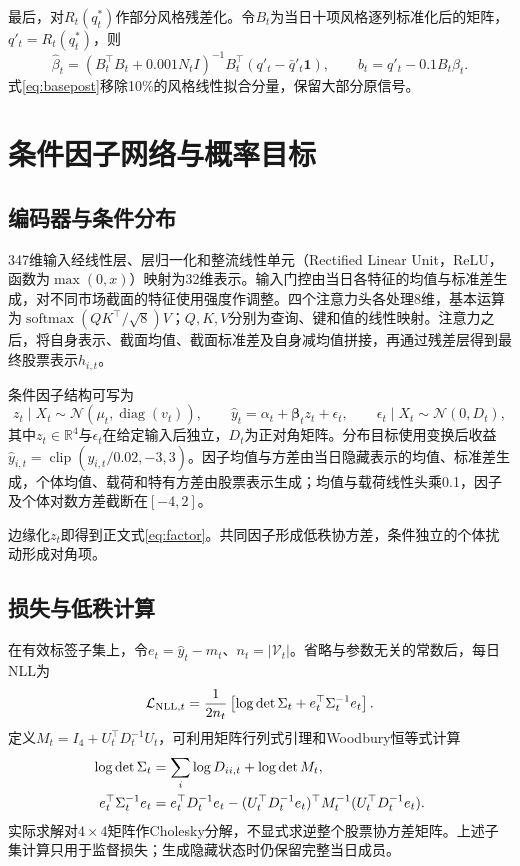 \documentclass[UTF8,11pt,a4paper,fontset=fandol]{ctexart}
\newcommand{\R}{\mathbb{R}}
\newcommand{\Beta}{\bm{\beta}}
\newcommand{\diag}{\operatorname{diag}}
\newcommand{\clip}{\operatorname{clip}}
\begin{document}
最后，对$R_t(q^*_t)$作部分风格残差化。令$B_t$为当日十项风格逐列标准化后的矩阵，$q'_t=R_t(q^*_t)$，则
\begin{equation}
 \hat\beta_t=(B_t^\top B_t+0.001N_t I)^{-1}B_t^\top(q'_t-\bar q'_t\bm 1),\qquad
 b_t=q'_t-0.1B_t\hat\beta_t.
 \label{eq:basepost}
\end{equation}
式\eqref{eq:basepost}移除10\%的风格线性拟合分量，保留大部分原信号。

\section{条件因子网络与概率目标}\label{app:factor}
\subsection{编码器与条件分布}
347维输入经线性层、层归一化和整流线性单元（Rectified Linear Unit，ReLU，函数为$\max(0,x)$）映射为32维表示。输入门控由当日各特征的均值与标准差生成，对不同市场截面的特征使用强度作调整。四个注意力头各处理8维，基本运算为$\operatorname{softmax}(QK^\top/\sqrt{8})V$；$Q,K,V$分别为查询、键和值的线性映射。注意力之后，将自身表示、截面均值、截面标准差及自身减均值拼接，再通过残差层得到最终股票表示$h_{i,t}$。

条件因子结构可写为
\begin{equation}
 z_t\mid X_t\sim\mathcal N(\mu_t,\diag(v_t)),\qquad
 \hat y_t=\alpha_t+\Beta_tz_t+\epsilon_t,\qquad
 \epsilon_t\mid X_t\sim\mathcal N(0,D_t),
 \label{eq:generative}
\end{equation}
其中$z_t\in\R^4$与$\epsilon_t$在给定输入后独立，$D_t$为正对角矩阵。分布目标使用变换后收益$\hat y_{i,t}=\clip(y_{i,t}/0.02,-3,3)$。因子均值与方差由当日隐藏表示的均值、标准差生成，个体均值、载荷和特有方差由股票表示生成；均值与载荷线性头乘0.1，因子及个体对数方差截断在$[-4,2]$。

边缘化$z_t$即得到正文式\eqref{eq:factor}。共同因子形成低秩协方差，条件独立的个体扰动形成对角项。

\subsection{损失与低秩计算}
在有效标签子集上，令$e_t=\hat y_t-m_t$、$n_t=|\mathcal V_t|$。省略与参数无关的常数后，每日NLL为
\begin{equation}
 \mathcal L_{{\rm NLL},t}=\frac{1}{2n_t}
 \left[\log\det\Sigma_t+e_t^\top\Sigma_t^{-1}e_t\right].
 \label{eq:nll}
\end{equation}
定义$M_t=I_4+U_t^\top D_t^{-1}U_t$，可利用矩阵行列式引理和Woodbury恒等式计算
\begin{align}
 \log\det\Sigma_t&=\sum_i\log D_{ii,t}+\log\det M_t,\notag\\
 e_t^\top\Sigma_t^{-1}e_t
 &=e_t^\top D_t^{-1}e_t
 -(U_t^\top D_t^{-1}e_t)^\top M_t^{-1}(U_t^\top D_t^{-1}e_t).
 \label{eq:woodbury}
\end{align}
实际求解对$4\times4$矩阵作Cholesky分解，不显式求逆整个股票协方差矩阵。上述子集计算只用于监督损失；生成隐藏状态时仍保留完整当日成员。
\end{document}
